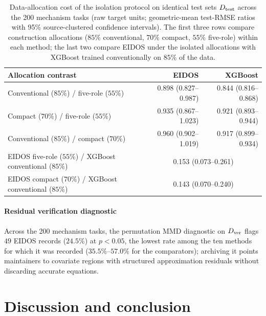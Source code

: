 \begin{table}[t]
\def\baselinestretch{1}\selectfont
\caption{Data-allocation cost of the isolation protocol on identical test sets \(D_{\rm test}\) across the 200 mechanism tasks (raw target units; geometric-mean test-RMSE ratios with 95\% source-clustered confidence intervals). The first three rows compare construction allocations (\(85\%\) conventional, \(70\%\) compact, \(55\%\) five-role) within each method; the last two compare EIDOS under the isolated allocations with XGBoost trained conventionally on \(85\%\) of the data.}\label{tab:protocolcost}
\centering\scriptsize
\setlength{\tabcolsep}{3.0pt}
\begin{tabular}{@{}lrr@{}}
\toprule
\textbf{Allocation contrast} & \textbf{EIDOS} & \textbf{XGBoost} \\
\midrule
Conventional (\(85\%\)) / five-role (\(55\%\)) & 0.898 (0.827--0.987) & 0.844 (0.816--0.868) \\
Compact (\(70\%\)) / five-role (\(55\%\)) & 0.935 (0.867--1.023) & 0.921 (0.893--0.944) \\
Conventional (\(85\%\)) / compact (\(70\%\)) & 0.960 (0.902--1.019) & 0.917 (0.899--0.934) \\
\addlinespace[3pt]
EIDOS five-role (\(55\%\)) / XGBoost conventional (\(85\%\)) & \multicolumn{2}{c}{0.153 (0.073--0.261)} \\
EIDOS compact (\(70\%\)) / XGBoost conventional (\(85\%\)) & \multicolumn{2}{c}{0.143 (0.070--0.240)} \\
\bottomrule
\end{tabular}
\end{table}

\paragraph{Residual verification diagnostic} Across the 200 mechanism tasks, the permutation MMD diagnostic on \(D_{\rm ver}\) flags \(49\) EIDOS records (\(24.5\%\)) at \(p<0.05\), the lowest rate among the ten methods for which it was recorded (\(35.5\%\)--\(57.0\%\) for the comparators); archiving it points maintainers to covariate regions with structured approximation residuals without discarding accurate equations.

\section{Discussion and conclusion}\label{sec:discussion}


